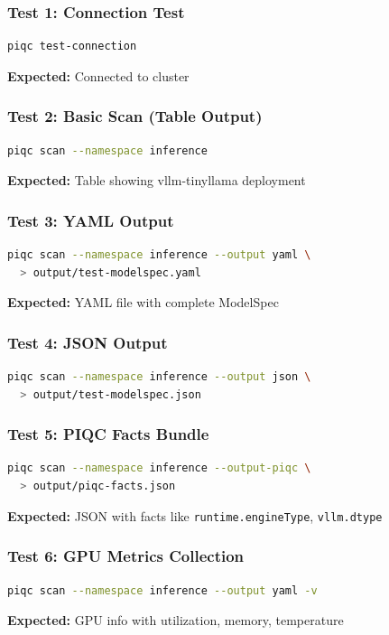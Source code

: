 \documentclass[11pt,a4paper]{article}
\begin{document}
\subsubsection{Test 1: Connection Test}
\begin{lstlisting}[language=bash]
piqc test-connection
\end{lstlisting}
\textbf{Expected:} Connected to cluster

\subsubsection{Test 2: Basic Scan (Table Output)}
\begin{lstlisting}[language=bash]
piqc scan --namespace inference
\end{lstlisting}
\textbf{Expected:} Table showing vllm-tinyllama deployment

\subsubsection{Test 3: YAML Output}
\begin{lstlisting}[language=bash]
piqc scan --namespace inference --output yaml \
  > output/test-modelspec.yaml
\end{lstlisting}
\textbf{Expected:} YAML file with complete ModelSpec

\subsubsection{Test 4: JSON Output}
\begin{lstlisting}[language=bash]
piqc scan --namespace inference --output json \
  > output/test-modelspec.json
\end{lstlisting}

\subsubsection{Test 5: PIQC Facts Bundle}
\begin{lstlisting}[language=bash]
piqc scan --namespace inference --output-piqc \
  > output/piqc-facts.json
\end{lstlisting}
\textbf{Expected:} JSON with facts like \texttt{runtime.engineType}, \texttt{vllm.dtype}

\subsubsection{Test 6: GPU Metrics Collection}
\begin{lstlisting}[language=bash]
piqc scan --namespace inference --output yaml -v
\end{lstlisting}
\textbf{Expected:} GPU info with utilization, memory, temperature
\end{document}
